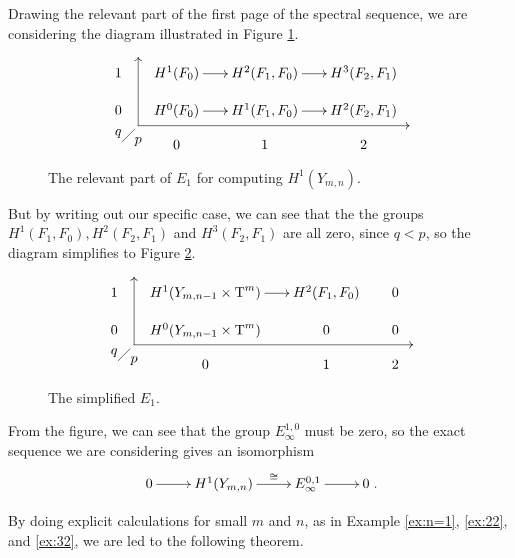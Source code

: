 Drawing the relevant part of the first page of the spectral sequence,
we are considering the diagram illustrated in Figure
\ref{fig:foerste}.
\begin{figure}[ht]
  \[ \xy
  (5,4); (5,-13); **\dir{-}; (5,4); *\dir{>};
  (5,-13); (73,-13); **\dir{-}; *\dir{<};
  (0,-15)*{q}; (5,-17)*{p};
  (1,-17); (4,-14); **\dir{-};
  (0,0)\xymatrix@R=1em@C=1.7em{
    1 & H^1(F_0) \ar[r]& H^2(F_1,F_0) \ar[r] & H^3(F_2,F_1) \\
    0 & H^0(F_0) \ar[r] & H^1(F_1,F_0) \ar[r] & H^2(F_2,F_1) \\
    & 0 & 1 & 2
  } \endxy \]
  \caption{The relevant part of $E_1$ for computing $H^1(Y_{m,n})$.}
  \label{fig:foerste}
\end{figure}
But by writing out our specific case, we can see that the the groups
$H^1(F_1,F_0), H^2(F_2,F_1)$ and $H^3(F_2,F_1)$ are all zero, since $q
< p$, so the diagram simplifies to Figure \ref{fig:anden}.
\begin{figure}[ht]
  \[ \xy
  (5,4); (5,-13); **\dir{-}; (5,4); *\dir{>};
  (5,-13); (75,-13); **\dir{-}; *\dir{<};
  (0,-15)*{q}; (5,-17)*{p};
  (1,-17); (4,-14); **\dir{-};
  (0,0)\xymatrix@R=1em@C=1.7em{
    1 & H^1(Y_{m,n-1}\times \T^m) \ar[r]& H^2(F_1,F_0) & 0 \\
    0 & H^0(Y_{m,n-1}\times \T^{m}) & 0 & 0 \\
    & 0 & 1 & 2
  } \endxy \]
  \caption{The simplified $E_1$.}
  \label{fig:anden}
\end{figure}
From the figure, we can see that the group $E_\infty^{1,0}$
must be zero, so the exact sequence we are considering gives an
isomorphism
\[ \xymatrix{0 \ar[r] & H^1(Y_{m,n}) \ar[r]^>>>>>{\cong} & E^{0,1}_\infty
  \ar[r] & 0}. \]

By doing explicit calculations for small $m$ and $n$, as in Example
\ref{ex:n=1}, \ref{ex:22}, and \ref{ex:32}, we are led to
the following theorem.

